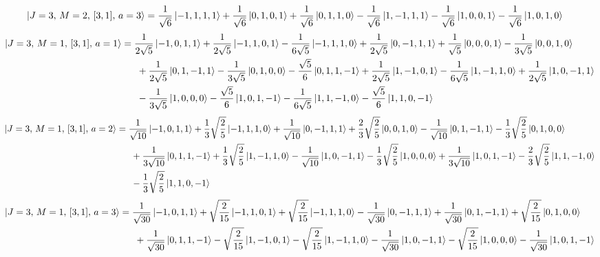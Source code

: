 \documentclass{article}
\begin{document}
\begin{equation*}
\begin{aligned}
\ket{J=3,\,M=2,\,[3,1],\,a=3} = \; &\frac{1}{\sqrt{6}} \ket{-1,1,1,1} + \frac{1}{\sqrt{6}} \ket{0,1,0,1} + \frac{1}{\sqrt{6}} \ket{0,1,1,0} - \frac{1}{\sqrt{6}} \ket{1,-1,1,1} - \frac{1}{\sqrt{6}} \ket{1,0,0,1} - \frac{1}{\sqrt{6}} \ket{1,0,1,0}
\end{aligned}
\end{equation*}
{\small
\begin{equation*}
\begin{aligned}
\ket{J=3,\,M=1,\,[3,1],\,a=1} = \; &\frac{1}{2\sqrt{5}} \ket{-1,0,1,1} + \frac{1}{2\sqrt{5}} \ket{-1,1,0,1} - \frac{1}{6\sqrt{5}} \ket{-1,1,1,0} + \frac{1}{2\sqrt{5}} \ket{0,-1,1,1} + \frac{1}{\sqrt{5}} \ket{0,0,0,1} - \frac{1}{3\sqrt{5}} \ket{0,0,1,0} \\
  & \; + \frac{1}{2\sqrt{5}} \ket{0,1,-1,1} - \frac{1}{3\sqrt{5}} \ket{0,1,0,0} - \frac{\sqrt{5}}{6} \ket{0,1,1,-1} + \frac{1}{2\sqrt{5}} \ket{1,-1,0,1} - \frac{1}{6\sqrt{5}} \ket{1,-1,1,0} + \frac{1}{2\sqrt{5}} \ket{1,0,-1,1} \\
  & \; - \frac{1}{3\sqrt{5}} \ket{1,0,0,0} - \frac{\sqrt{5}}{6} \ket{1,0,1,-1} - \frac{1}{6\sqrt{5}} \ket{1,1,-1,0} - \frac{\sqrt{5}}{6} \ket{1,1,0,-1}
\end{aligned}
\end{equation*}}
{\small
\begin{equation*}
\begin{aligned}
\ket{J=3,\,M=1,\,[3,1],\,a=2} = \; &\frac{1}{\sqrt{10}} \ket{-1,0,1,1} + \frac{1}{3}\sqrt{\frac{2}{5}} \ket{-1,1,1,0} + \frac{1}{\sqrt{10}} \ket{0,-1,1,1} + \frac{2}{3}\sqrt{\frac{2}{5}} \ket{0,0,1,0} - \frac{1}{\sqrt{10}} \ket{0,1,-1,1} - \frac{1}{3}\sqrt{\frac{2}{5}} \ket{0,1,0,0} \\
  & \; + \frac{1}{3\sqrt{10}} \ket{0,1,1,-1} + \frac{1}{3}\sqrt{\frac{2}{5}} \ket{1,-1,1,0} - \frac{1}{\sqrt{10}} \ket{1,0,-1,1} - \frac{1}{3}\sqrt{\frac{2}{5}} \ket{1,0,0,0} + \frac{1}{3\sqrt{10}} \ket{1,0,1,-1} - \frac{2}{3}\sqrt{\frac{2}{5}} \ket{1,1,-1,0} \\
  & \; - \frac{1}{3}\sqrt{\frac{2}{5}} \ket{1,1,0,-1}
\end{aligned}
\end{equation*}}
{\small
\begin{equation*}
\begin{aligned}
\ket{J=3,\,M=1,\,[3,1],\,a=3} = \; &\frac{1}{\sqrt{30}} \ket{-1,0,1,1} + \sqrt{\frac{2}{15}} \ket{-1,1,0,1} + \sqrt{\frac{2}{15}} \ket{-1,1,1,0} - \frac{1}{\sqrt{30}} \ket{0,-1,1,1} + \frac{1}{\sqrt{30}} \ket{0,1,-1,1} + \sqrt{\frac{2}{15}} \ket{0,1,0,0} \\
  & \; + \frac{1}{\sqrt{30}} \ket{0,1,1,-1} - \sqrt{\frac{2}{15}} \ket{1,-1,0,1} - \sqrt{\frac{2}{15}} \ket{1,-1,1,0} - \frac{1}{\sqrt{30}} \ket{1,0,-1,1} - \sqrt{\frac{2}{15}} \ket{1,0,0,0} - \frac{1}{\sqrt{30}} \ket{1,0,1,-1}
\end{aligned}
\end{equation*}}
\end{document}
